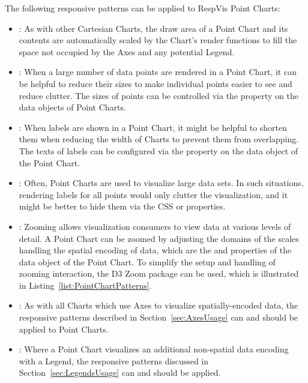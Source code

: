The following responsive patterns can be applied to RespVis Point
Charts:
\begin{itemize}
\item {}: As with other Cartesian Charts, the
  draw area of a Point Chart and its contents are automatically
  scaled by the Chart's render functions to fill the space not
  occupied by the Axes and any potential Legend.

\item {}: When a large number of data points are
  rendered in a Point Chart, it can be helpful to reduce their sizes
  to make individual points easier to see and reduce clutter. The
  sizes of points can be controlled via the  property
  on the data objects of Point Charts.

\item {}: When labels are shown in a Point
  Chart, it might be helpful to shorten them when reducing the width
  of Charts to prevent them from overlapping. The texts of labels can
  be configured via the  property on the data object of
  the Point Chart.

\item {}: Often, Point Charts are used to
  visualize large data sets. In such situations, rendering labels
  for all points would only clutter the visualization, and it might be
  better to hide them via the CSS  or 
  properties.

\item {}: Zooming allows visualization consumers
  to view data at various levels of detail. A Point Chart can be
  zoomed by adjusting the domains of the scales handling the spatial
  encoding of data, which are the  and 
  properties of the data object of the Point Chart. To simplify the
  setup and handling of zooming interaction, the D3 Zoom package
  \parencite{D3Zoom} can be used, which is illustrated in
  Listing~\ref{list:PointChartPatterns}.

\item {}: As with all Charts which use Axes
  to visualize spatially-encoded data, the responsive patterns
  described in Section~\ref{sec:AxesUsage} can and should be applied
  to Point Charts.

\item {}: Where a Point Chart visualizes
  an additional non-spatial data encoding with a Legend, the
  responsive patterns discussed in Section~\ref{sec:LegendsUsage} can
  and should be applied.
\end{itemize}







